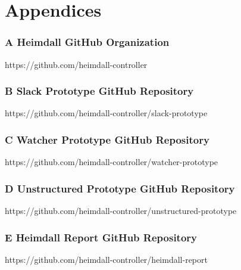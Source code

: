 \documentclass{article}
\begin{document}
\section*{Appendices}
\subsubsection*{A Heimdall GitHub Organization} 
\hypertarget{appendix-a}{https://github.com/heimdall-controller}

\subsubsection*{B Slack Prototype GitHub Repository} 
\hypertarget{appendix-b}{https://github.com/heimdall-controller/slack-prototype}

\subsubsection*{C Watcher Prototype GitHub Repository} 
\hypertarget{appendix-c}{https://github.com/heimdall-controller/watcher-prototype}

\subsubsection*{D Unstructured Prototype GitHub Repository} 
\hypertarget{appendix-d}{https://github.com/heimdall-controller/unstructured-prototype}

\subsubsection*{E Heimdall Report GitHub Repository} \label{appendix-e}
\hypertarget{appendix-e}{https://github.com/heimdall-controller/heimdall-report}
\end{document}
